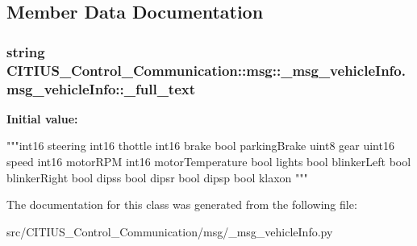 \subsection{\-Member \-Data \-Documentation}
\hypertarget{class_c_i_t_i_u_s___control___communication_1_1msg_1_1__msg__vehicle_info_1_1msg__vehicle_info_a31b8c9526d1be0b4df27063718c3c13f}{
\subsubsection[{\-\_\-full\-\_\-text}]{\setlength{\rightskip}{0pt plus 5cm}string \-C\-I\-T\-I\-U\-S\-\_\-\-Control\-\_\-\-Communication\-::msg\-::\-\_\-msg\-\_\-vehicle\-Info.\-msg\-\_\-vehicle\-Info\-::\-\_\-full\-\_\-text}}\label{class_c_i_t_i_u_s___control___communication_1_1msg_1_1__msg__vehicle_info_1_1msg__vehicle_info_a31b8c9526d1be0b4df27063718c3c13f}
{\bfseries \-Initial value\-:}
\begin{DoxyCode}
"""int16 steering
int16 thottle
int16 brake
bool parkingBrake
uint8 gear
uint16 speed
int16 motorRPM
int16 motorTemperature
bool lights
bool blinkerLeft
bool blinkerRight
bool dipss
bool dipsr
bool dipsp
bool klaxon
"""
\end{DoxyCode}


\-The documentation for this class was generated from the following file\-:\begin{DoxyCompactItemize}
\item 
src/\-C\-I\-T\-I\-U\-S\-\_\-\-Control\-\_\-\-Communication/msg/\-\_\-msg\-\_\-vehicle\-Info.\-py\end{DoxyCompactItemize}
